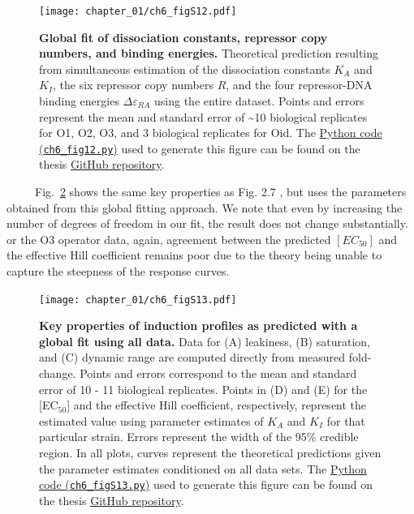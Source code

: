 \documentclass[12pt]{caltech_thesis}
\begin{document}
\hypertarget{fig:induction_global_fit}{%
\begin{figure}
\centering
\texttt{[image: chapter\_01/ch6\_figS12.pdf]}
\caption[{Induction curves using global parameter
estimates.}]{\textbf{Global fit of dissociation constants, repressor
copy numbers, and binding energies.} Theoretical prediction resulting
from simultaneous estimation of the dissociation constants \(K_A\) and
\(K_I\), the six repressor copy numbers \(R\), and the four
repressor-DNA binding energies \(\Delta\varepsilon_{RA}\) using the
entire dataset. Points and errors represent the mean and standard error
of \textasciitilde10 biological replicates for O1, O2, O3, and 3
biological replicates for Oid. The
\href{https://github.com/gchure/phd/blob/master/src/chapter_06/code/ch6_figS12.py}{Python
code (\texttt{ch6\_fig12.py})} used to generate this figure can be found
on the thesis \href{https://github.com/gchure/phd}{GitHub repository}.}
\label{fig:induction_global_fit}
\end{figure}
}

~~~~~Fig.~\ref{fig:properties_global_fit} shows the same key properties
as Fig. 2.7 , but uses the parameters obtained from this global fitting
approach. We note that even by increasing the number of degrees of
freedom in our fit, the result does not change substantially. or the O3
operator data, again, agreement between the predicted \([EC_{50}]\) and
the effective Hill coefficient remains poor due to the theory being
unable to capture the steepness of the response curves.

\hypertarget{fig:properties_global_fit}{%
\begin{figure}
\centering
\texttt{[image: chapter\_01/ch6\_figS13.pdf]}
\caption[{Key properties of induction profiles as predicted with a
global fit using all data.}]{\textbf{Key properties of induction
profiles as predicted with a global fit using all data.} Data for (A)
leakiness, (B) saturation, and (C) dynamic range are computed directly
from measured fold-change. Points and errors correspond to the mean and
standard error of 10 - 11 biological replicates. Points in (D) and (E)
for the {[}EC\(_{50}\){]} and the effective Hill coefficient,
respectively, represent the estimated value using parameter estimates of
\(K_A\) and \(K_I\) for that particular strain. Errors represent the
width of the 95\% credible region. In all plots, curves represent the
theoretical predictions given the parameter estimates conditioned on all
data sets. The
\href{https://github.com/gchure/phd/blob/master/src/chapter_06/code/ch6_figS13.py}{Python
code (\texttt{ch6\_figS13.py})} used to generate this figure can be
found on the thesis \href{https://github.com/gchure/phd}{GitHub
repository}.}
\label{fig:properties_global_fit}
\end{figure}
}
\end{document}

